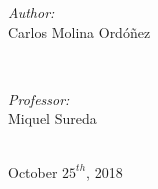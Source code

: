 \begin{titlepage}
\begin{minipage}{0.4\textwidth}
\begin{flushleft} \large
\emph{Author:}\\
{ \normalsize
Carlos Molina Ordóñez\\
}
\end{flushleft}
\end{minipage}
~
\begin{minipage}{0.4\textwidth}
\begin{flushright} \large
\emph{Professor:} \\
\normalsize Miquel Sureda
\end{flushright}
\end{minipage}\\[2cm]



\flushleft
{\normalsize October $25^{th}$, 2018}\\[2cm] %



\vfill %

\end{titlepage}
